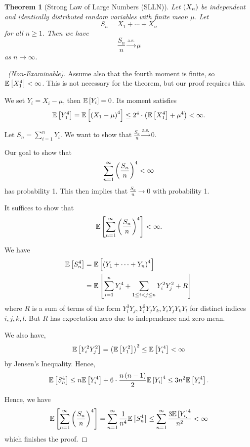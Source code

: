 \documentclass{article}
\newtheorem{theorem}{Theorem}[section]
\theoremstyle{definition}
\theoremstyle{remark}
\newcommand{\Expt}{\mathbb{E}}
\newcommand{\toAlmostSure}{\xrightarrow{\mathrm{a.s.}}}
\begin{document}
\begin{theorem}[Strong Law of Large Numbers (SLLN)]
    \label{thm:strong-law-of-large-numbers}%
    Let \(\left(X_n\right)\) be independent and identically distributed random variables with finite mean \(\mu\). Let
    \[
        S_n = X_1 + \cdots + X_n
    \]
    for all \(n \geq 1\). Then we have
    \[
        \frac{S_n}{n} \toAlmostSure \mu
    \]
    as \(n \to \infty\).
\end{theorem}

\begin{proof}[\proofname\ (Non-Examinable)]
    Assume also that the fourth moment is finite, so \(\Expt\bqty{X_1^4} < \infty\). This is not necessary for the theorem, but our proof requires this.

    We set \(Y_i = X_i - \mu\), then \(\Expt\bqty{Y_i} = 0\). Its moment satisfies
    \[
        \Expt\bqty{Y_1^4} = \Expt\bqty{\pqty{X_1 - \mu}^4} \leq 2^4 \cdot \pqty{\Expt\bqty{X_1^4} + \mu^4} < \infty.
    \]

    Let \(S_n = \sum_{i = 1}^{n} Y_i\). We want to show that \(\frac{S_n}{n} \toAlmostSure 0\).

    Our goal to show that
    \[
        \sum_{n = 1}^{\infty} \left(\frac{S_n}{n}\right)^4 < \infty
    \]
    has probability 1. This then implies that \(\frac{S_n}{n} \to 0\) with probability 1.

    It suffices to show that
    \[
        \Expt\bqty{\sum_{n = 1}^{\infty} \pqty{\frac{S_n}{n}}^4} < \infty.
    \]

    We have
    \begin{align*}
        \Expt\bqty{S_n^4} &= \Expt\bqty{\pqty{Y_1 + \cdots + Y_n}^4} \\
        &= \Expt\bqty{\sum_{i = 1}^{n} Y_i^4 + \sum_{1 \leq i < j \leq n} Y_i^2 Y_j^2 + R}
    \end{align*}
    where \(R\) is a sum of terms of the form \(Y_i^3 Y_j, Y_i^2 Y_j Y_k, Y_i Y_j Y_k Y_l\) for distinct indices \(i, j, k, l\). But \(R\) has expectation zero due to independence and zero mean.

    We also have,
    \[
        \Expt\bqty{Y_i^2 Y_j^2} = \pqty{\Expt\bqty{Y_1^2}}^2 \leq \Expt\bqty{Y_i^4} < \infty
    \]
    by Jensen's Inequality. Hence,
    \[
        \Expt\bqty{S_n^4} \leq n \Expt\bqty{Y_i^4} + 6 \cdot \frac{n \pqty{n - 1}}{2} \Expt\bqty{Y_i}^4 \leq 3n^2 \Expt\bqty{Y_i^4}.
    \]

    Hence, we have
    \[
        \Expt\bqty{\sum_{n = 1}^{\infty} \pqty{\frac{S_n}{n}}^4} = \sum_{n = 1}^{\infty} \frac{1}{n^4} \Expt\bqty{S_n^4} \leq \sum_{n = 1}^{\infty} \frac{3 \Expt\bqty{Y_i}^4}{n^2} < \infty
    \]
    which finishes the proof.
\end{proof}
\end{document}
